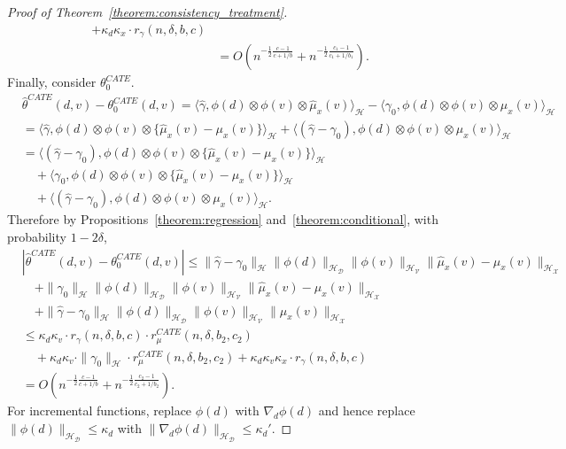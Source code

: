 \begin{proof}[Proof of Theorem~\ref{theorem:consistency_treatment}]
\begin{align*}
      +\kappa_d\kappa_x \cdot r_{\gamma}(n,\delta,b,c)
      \\
      &=O\left(n^{-\frac{1}{2}\frac{c-1}{c+1/b}}+n^{-\frac{1}{2}\frac{c_1-1}{c_1+1/b_1}}\right).
   \end{align*}
    Finally, consider $\theta_0^{CATE}$.
    \begin{align*}
        &\hat{\theta}^{CATE}(d,v)-\theta_0^{CATE}(d,v)=\langle \hat{\gamma} , \phi(d)\otimes \phi(v)\otimes \hat{\mu}_{x}(v) \rangle_{\mathcal{H}} - \langle \gamma_0 , \phi(d )\otimes \phi(v) \otimes \mu_{x}(v) \rangle_{\mathcal{H}} \\
        &=\langle \hat{\gamma} , \phi(d)\otimes \phi(v)\otimes\{\hat{\mu}_{x}(v)-\mu_{x}(v)\} \rangle_{\mathcal{H}} + \langle (\hat{\gamma}-\gamma_0), \phi(d)\otimes \phi(v) \otimes \mu_{x}(v) \rangle_{\mathcal{H}} \\
        &=\langle (\hat{\gamma}-\gamma_0), \phi(d)\otimes \phi(v)\otimes\{\hat{\mu}_{x}(v)-\mu_{x}(v)\} \rangle_{\mathcal{H}}  \\
        &\quad + \langle \gamma_0, \phi(d)\otimes \phi(v)\otimes\{\hat{\mu}_{x}(v)-\mu_{x}(v)\} \rangle_{\mathcal{H}}\\
        &\quad +\langle (\hat{\gamma}-\gamma_0), \phi(d)\otimes \phi(v) \otimes \mu_{x}(v) \rangle_{\mathcal{H}}.
    \end{align*}
    Therefore by Propositions~\ref{theorem:regression} and~\ref{theorem:conditional}, with probability $1-2\delta$,
   \begin{align*}
       &|\hat{\theta}^{CATE}(d,v)-\theta_0^{CATE}(d,v)|\leq 
       \|\hat{\gamma}-\gamma_0\|_{\mathcal{H}}\|\phi(d)\|_{\mathcal{H}_{\mathcal{D}}}\|\phi(v)\|_{\mathcal{H}_{\mathcal{V}}} \|\hat{\mu}_{x}(v)-\mu_{x}(v)\|_{\mathcal{H}_{\mathcal{X}}}\\
      &\quad+
       \|\gamma_0\|_{\mathcal{H}}\|\phi(d)\|_{\mathcal{H}_{\mathcal{D}}}\|\phi(v)\|_{\mathcal{H}_{\mathcal{V}}}\|\hat{\mu}_{x}(v)-\mu_{x}(v)\|_{\mathcal{H}_{\mathcal{X}}} \\
       &\quad+
       \|\hat{\gamma}-\gamma_0\|_{\mathcal{H}}\|\phi(d)\|_{\mathcal{H}_{\mathcal{D}}}\|\phi(v)\|_{\mathcal{H}_{\mathcal{V}}} \|\mu_{x}(v)\|_{\mathcal{H}_{\mathcal{X}}}
      \\
      &\leq \kappa_d\kappa_{v} \cdot r_{\gamma}(n,\delta,b,c) \cdot r_{\mu}^{CATE}(n,\delta,b_2,c_2)\\
      &\quad+\kappa_d\kappa_{v}\cdot\|\gamma_0\|_{\mathcal{H}} \cdot r_{\mu}^{CATE}(n,\delta,b_2,c_2)
      +\kappa_d\kappa_{v} \kappa_{x} \cdot r_{\gamma}(n,\delta,b,c)
      \\
      &=O\left(n^{-\frac{1}{2}\frac{c-1}{c+1/b}}+n^{-\frac{1}{2}\frac{c_2-1}{c_2+1/b_2}}\right).
   \end{align*}
    For incremental functions, replace $\phi(d)$ with $\nabla_d \phi(d)$ and hence replace $\|\phi(d)\|_{\mathcal{H}_{\mathcal{D}}}\leq \kappa_d$ with $\|\nabla_d \phi(d)\|_{\mathcal{H}_{\mathcal{D}}}\leq \kappa_d'$.
\end{proof}

